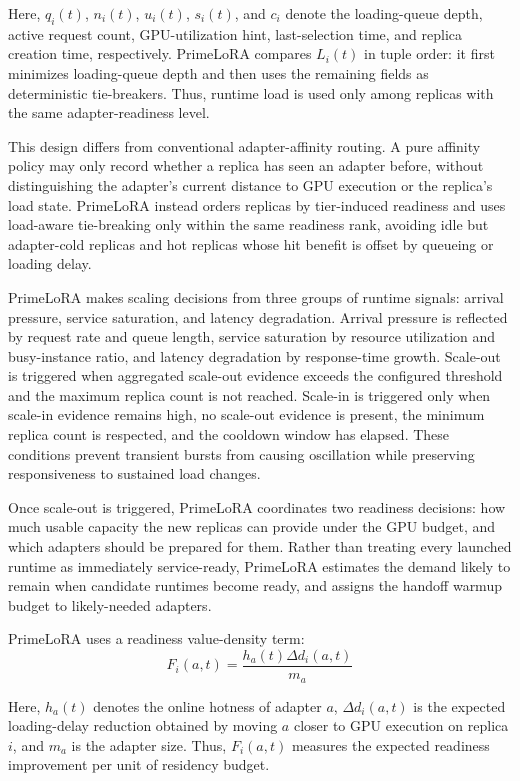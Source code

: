 \documentclass[lettersize,journal]{IEEEtran}
\begin{document}
Here, $q_i(t)$, $n_i(t)$, $u_i(t)$, $s_i(t)$, and $c_i$ denote the loading-queue depth, active request count, GPU-utilization hint, last-selection time, and replica creation time, respectively. PrimeLoRA compares $L_i(t)$ in tuple order: it first minimizes loading-queue depth and then uses the remaining fields as deterministic tie-breakers. Thus, runtime load is used only among replicas with the same adapter-readiness level.

This design differs from conventional adapter-affinity routing. A pure affinity policy may only record whether a replica has seen an adapter before, without distinguishing the adapter's current distance to GPU execution or the replica's load state. PrimeLoRA instead orders replicas by tier-induced readiness and uses load-aware tie-breaking only within the same readiness rank, avoiding idle but adapter-cold replicas and hot replicas whose hit benefit is offset by queueing or loading delay.

PrimeLoRA makes scaling decisions from three groups of runtime signals: arrival pressure, service saturation, and latency degradation. Arrival pressure is reflected by request rate and queue length, service saturation by resource utilization and busy-instance ratio, and latency degradation by response-time growth. Scale-out is triggered when aggregated scale-out evidence exceeds the configured threshold and the maximum replica count is not reached. Scale-in is triggered only when scale-in evidence remains high, no scale-out evidence is present, the minimum replica count is respected, and the cooldown window has elapsed. These conditions prevent transient bursts from causing oscillation while preserving responsiveness to sustained load changes.

Once scale-out is triggered, PrimeLoRA coordinates two readiness decisions: how much usable capacity the new replicas can provide under the GPU budget, and which adapters should be prepared for them. Rather than treating every launched runtime as immediately service-ready, PrimeLoRA estimates the demand likely to remain when candidate runtimes become ready, and assigns the handoff warmup budget to likely-needed adapters.

PrimeLoRA uses a readiness value-density term:
\begin{equation}
F_i(a,t)=
\frac{h_a(t)\Delta d_i(a,t)}{m_a}
\label{eq:adapter_value}
\end{equation}

Here, $h_a(t)$ denotes the online hotness of adapter $a$, $\Delta d_i(a,t)$ is the expected loading-delay reduction obtained by moving $a$ closer to GPU execution on replica $i$, and $m_a$ is the adapter size. Thus, $F_i(a,t)$ measures the expected readiness improvement per unit of residency budget.
\end{document}
